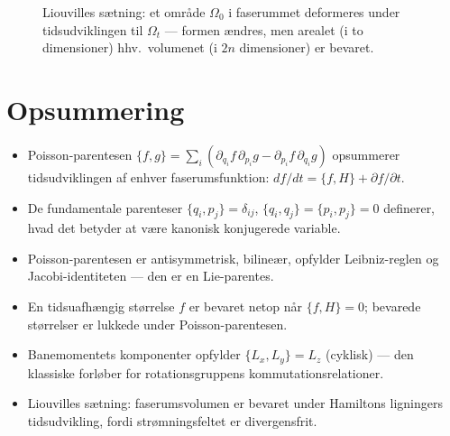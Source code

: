 \begin{figure}[htbp]
  \centering
  \caption{Liouvilles sætning: et område $\Omega_0$ i faserummet
  deformeres under tidsudviklingen til $\Omega_t$ — formen ændres,
  men arealet (i to dimensioner) hhv.\ volumenet (i $2n$ dimensioner)
  er bevaret.}
  \label{fig:liouville}
\end{figure}

\section{Opsummering}

\begin{itemize}
  \item Poisson-parentesen $\{f,g\}=\sum_i(\partial_{q_i}f\,\partial_{p_i}g - \partial_{p_i}f\,\partial_{q_i}g)$
        opsummerer tidsudviklingen af enhver faserumsfunktion:
        $df/dt = \{f,H\} + \partial f/\partial t$.
  \item De fundamentale parenteser $\{q_i,p_j\}=\delta_{ij}$,
        $\{q_i,q_j\}=\{p_i,p_j\}=0$ definerer, hvad det betyder at være
        kanonisk konjugerede variable.
  \item Poisson-parentesen er antisymmetrisk, bilineær, opfylder
        Leibniz-reglen og Jacobi-identiteten — den er en Lie-parentes.
  \item En tidsuafhængig størrelse $f$ er bevaret netop når
        $\{f,H\}=0$; bevarede størrelser er lukkede under
        Poisson-parentesen.
  \item Banemomentets komponenter opfylder $\{L_x,L_y\}=L_z$ (cyklisk)
        — den klassiske forløber for rotationsgruppens
        kommutationsrelationer.
  \item Liouvilles sætning: faserumsvolumen er bevaret under
        Hamiltons ligningers tidsudvikling, fordi strømningsfeltet er
        divergensfrit.
\end{itemize}

